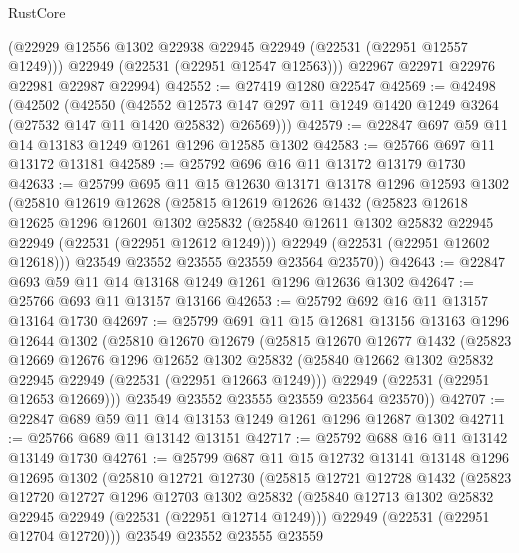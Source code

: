 \begin{lexlean}{RustCore}
\begin{coremodule}
        (@22929 @12556 @1302 @22938 @22945 @22949 (@22531 (@22951 @12557 @1249)))
        @22949
        (@22531 (@22951 @12547 @12563)))
      @22967
      @22971
      @22976
      @22981
      @22987
      @22994)
@42552 := @27419 @1280 @22547
@42569 := @42498
    (@42502
      (@42550
        (@42552
          @12573
          @147
          @297
          @11
          @1249
          @1420
          @1249
          @3264
          (@27532 @147 @11 @1420 @25832)
          @26569)))
@42579 := @22847 @697 @59 @11 @14 @13183 @1249 @1261 @1296 @12585 @1302
@42583 := @25766 @697 @11 @13172 @13181
@42589 := @25792 @696 @16 @11 @13172 @13179 @1730
@42633 := @25799
    @695
    @11
    @15
    @12630
    @13171
    @13178
    @1296
    @12593
    @1302
    (@25810
      @12619
      @12628
      (@25815
        @12619
        @12626
        @1432
        (@25823
          @12618
          @12625
          @1296
          @12601
          @1302
          @25832
          (@25840 @12611 @1302 @25832 @22945 @22949 (@22531 (@22951 @12612 @1249)))
          @22949
          (@22531 (@22951 @12602 @12618)))
        @23549
        @23552
        @23555
        @23559
        @23564
        @23570))
@42643 := @22847 @693 @59 @11 @14 @13168 @1249 @1261 @1296 @12636 @1302
@42647 := @25766 @693 @11 @13157 @13166
@42653 := @25792 @692 @16 @11 @13157 @13164 @1730
@42697 := @25799
    @691
    @11
    @15
    @12681
    @13156
    @13163
    @1296
    @12644
    @1302
    (@25810
      @12670
      @12679
      (@25815
        @12670
        @12677
        @1432
        (@25823
          @12669
          @12676
          @1296
          @12652
          @1302
          @25832
          (@25840 @12662 @1302 @25832 @22945 @22949 (@22531 (@22951 @12663 @1249)))
          @22949
          (@22531 (@22951 @12653 @12669)))
        @23549
        @23552
        @23555
        @23559
        @23564
        @23570))
@42707 := @22847 @689 @59 @11 @14 @13153 @1249 @1261 @1296 @12687 @1302
@42711 := @25766 @689 @11 @13142 @13151
@42717 := @25792 @688 @16 @11 @13142 @13149 @1730
@42761 := @25799
    @687
    @11
    @15
    @12732
    @13141
    @13148
    @1296
    @12695
    @1302
    (@25810
      @12721
      @12730
      (@25815
        @12721
        @12728
        @1432
        (@25823
          @12720
          @12727
          @1296
          @12703
          @1302
          @25832
          (@25840 @12713 @1302 @25832 @22945 @22949 (@22531 (@22951 @12714 @1249)))
          @22949
          (@22531 (@22951 @12704 @12720)))
        @23549
        @23552
        @23555
        @23559

\end{coremodule}
\end{lexlean}
